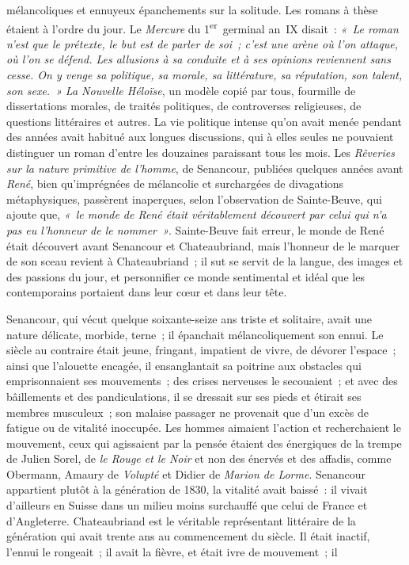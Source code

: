 \documentclass[french,twoside]{book} %
\begin{document}
\label{p594}mélancoliques et ennuyeux épanchements sur la solitude. Les romans à thèse étaient à l’ordre du jour. Le \emph{Mercure} du 1\textsuperscript{er} germinal an IX disait : \emph{« Le roman n’est que le prétexte, le but est de parler de soi ; c’est une arène où l’on attaque, où l’on se défend. Les allusions à sa conduite et à ses opinions reviennent sans cesse. On y venge sa politique, sa morale, sa littérature, sa réputation, son talent, son sexe. »} \emph{La Nouvelle Héloïse}, un modèle copié par tous, fourmille de dissertations morales, de traités politiques, de controverses religieuses, de questions littéraires et autres. La vie politique intense qu’on avait menée pendant des années avait habitué aux longues discussions, qui à elles seules ne pouvaient distinguer un roman d’entre les douzaines paraissant tous les mois. Les \emph{Rêveries sur la nature primitive de l’homme}, de Senancour, publiées quelques années avant \emph{René}, bien qu’imprégnées de mélancolie et surchargées de divagations métaphysiques, passèrent inaperçues, selon l’observation de Sainte-Beuve, qui ajoute que, \emph{« le monde de René était véritablement découvert par celui qui n’a pas eu l’honneur de le nommer »}. Sainte-Beuve fait erreur, le monde de René était découvert avant Senancour et Chateaubriand, mais l’honneur de le marquer de son sceau revient à Chateaubriand ; il sut se servit de la langue, des images et des passions du jour, et personnifier ce monde sentimental et idéal que les contemporains portaient dans leur cœur et dans leur tête.\par
Senancour, qui vécut quelque soixante-seize ans triste et solitaire, avait une nature délicate, morbide, terne ; il épanchait mélancoliquement son ennui. Le siècle au contraire était jeune, fringant, impatient de vivre, de dévorer l’espace ; ainsi que l’alouette encagée, il ensanglantait sa poitrine aux obstacles qui emprisonnaient ses mouvements ; des crises nerveuses le secouaient ; et avec des bâillements et des pandiculations, il se dressait sur ses pieds et étirait ses membres musculeux ; son malaise passager ne provenait que d’un excès de fatigue ou de vitalité inoccupée. Les hommes aimaient l’action et recherchaient le mouvement, ceux qui agissaient par la pensée étaient des énergiques de la trempe de Julien Sorel, de \emph{le Rouge et le Noir} et non des énervés et des affadis, comme Obermann, Amaury de \emph{Volupté} et Didier de \emph{Marion de Lorme}. Senancour appartient plutôt à la génération de 1830, la vitalité avait baissé : il vivait d’ailleurs en Suisse dans un milieu moins surchauffé que celui de France et d’Angleterre. Chateaubriand est le véritable représentant littéraire de la génération qui avait trente ans au commencement du siècle. Il était inactif, l’ennui le rongeait ; il avait la fièvre, et était ivre de mouvement ; il  
\end{document}
